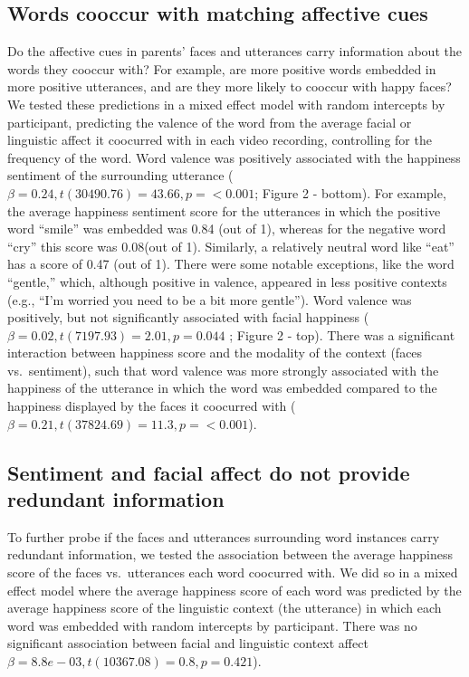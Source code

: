 \documentclass[10pt, letterpaper]{article}
\begin{document}
\subsection{Words cooccur with matching affective
cues}\label{words-cooccur-with-matching-affective-cues}

Do the affective cues in parents' faces and utterances carry information
about the words they cooccur with? For example, are more positive words
embedded in more positive utterances, and are they more likely to
cooccur with happy faces? We tested these predictions in a mixed effect
model with random intercepts by participant, predicting the valence of
the word from the average facial or linguistic affect it coocurred with
in each video recording, controlling for the frequency of the word. Word
valence was positively associated with the happiness sentiment of the
surrounding utterance
(\(\beta = 0.24, \textit{t}(30490.76) = 43.66, \textit{p} = < 0.001\);
Figure 2 - bottom). For example, the average happiness sentiment score
for the utterances in which the positive word ``smile'' was embedded was
0.84 (out of 1), whereas for the negative word ``cry'' this score was
0.08(out of 1). Similarly, a relatively neutral word like ``eat'' has a
score of 0.47 (out of 1). There were some notable exceptions, like the
word ``gentle,'' which, although positive in valence, appeared in less
positive contexts (e.g., ``I'm worried you need to be a bit more
gentle''). Word valence was positively, but not significantly associated
with facial happiness (
\(\beta = 0.02, \textit{t}(7197.93) = 2.01, \textit{p} = 0.044\) ;
Figure 2 - top). There was a significant interaction between happiness
score and the modality of the context (faces vs.~sentiment), such that
word valence was more strongly associated with the happiness of the
utterance in which the word was embedded compared to the happiness
displayed by the faces it coocurred with
(\(\beta = 0.21, \textit{t}(37824.69) = 11.3, \textit{p} = < 0.001\)).

\subsection{Sentiment and facial affect do not provide redundant
information}\label{sentiment-and-facial-affect-do-not-provide-redundant-information}

To further probe if the faces and utterances surrounding word instances
carry redundant information, we tested the association between the
average happiness score of the faces vs.~utterances each word coocurred
with. We did so in a mixed effect model where the average happiness
score of each word was predicted by the average happiness score of the
linguistic context (the utterance) in which each word was embedded with
random intercepts by participant. There was no significant association
between facial and linguistic context affect
\(\beta = 8.8e-03, \textit{t}(10367.08) = 0.8, \textit{p} = 0.421\)).
\end{document}
